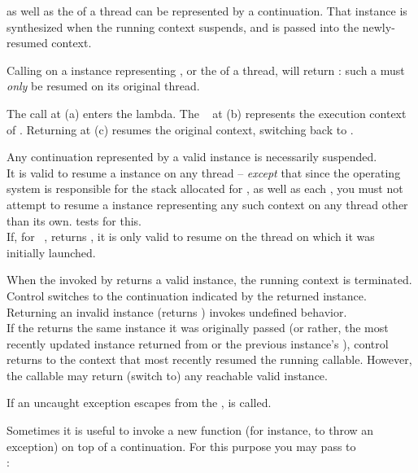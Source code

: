 \label{subsec:main}

\main as well as the \entryfn of a thread can be represented by a continuation.
That \cont instance is synthesized when the running context suspends, and is
passed into the newly-resumed context.

Calling  on a \cont instance representing \main, or
the \entryfn of a thread, will return : such a \cont
must \emph{only} be resumed on its original thread.

The  call at (a) enters the lambda. The \cont\  at (b)
represents the execution context of \main. Returning  at (c) resumes the
original context, switching back to \main.


Any continuation represented by a valid \cont instance is necessarily suspended.\\
It is valid to resume a \cont instance on any thread -- \emph{except} that
since the operating system is responsible for the stack allocated for \main,
as well as each , you must not attempt to resume a \cont
instance representing any such context on any thread other
than its own.  tests for this.\\
If, for \cont\ ,  returns , it is
only valid to resume  on the thread on which it was initially
launched.


When the \entryfn invoked by \cc returns a valid \cont instance,
the running context is terminated. Control switches to the continuation
indicated by the returned \cont instance.\\
Returning an invalid \cont instance (\opbool returns ) invokes
undefined behavior.\\
If the \entryfn returns the same \cont instance it was originally
passed (or rather, the most recently updated instance returned from \callcc or the
previous instance's \resume), control returns to the context that most
recently resumed the running callable. However, the callable may return (switch
to) any reachable valid \cont instance.


\label{subsec:exceptions}
If an uncaught exception escapes from the \entryfn,  is
called.


Sometimes it is useful to invoke a new function (for instance, to throw an
exception) on top of a continuation. For this purpose you may pass to\\
:

